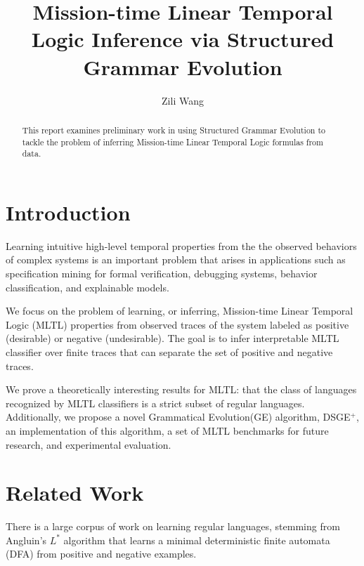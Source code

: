 \documentclass[runningheads]{llncs}
\begin{document}
%
\title{Mission-time Linear Temporal Logic Inference via Structured Grammar Evolution
}
%
%
\author{Zili Wang}
%
%
%
\maketitle              %
%
\begin{abstract}
This report examines preliminary work in using Structured Grammar Evolution to tackle the problem of inferring Mission-time Linear Temporal Logic formulas from data.
\end{abstract}
%
%
%
\section{Introduction}
Learning intuitive high-level temporal properties from the the observed behaviors of complex systems is an important problem that arises in applications such as specification mining for formal verification, debugging systems, behavior classification, and explainable models. 

We focus on the problem of learning, or inferring, Mission-time Linear Temporal Logic (MLTL) properties from observed traces of the system labeled as positive (desirable) or negative (undesirable). The goal is to infer interpretable MLTL classifier over finite traces that can separate the set of positive and negative traces. 

We prove a theoretically interesting results for MLTL: that the class of languages recognized by MLTL classifiers is a strict subset of regular languages. 
Additionally, we propose a novel Grammatical Evolution(GE) algorithm, DSGE$^+$, an implementation of this algorithm, a set of MLTL benchmarks for future research, and experimental evaluation.

\section{Related Work}
There is a large corpus of work on learning regular languages, stemming from Angluin's $L^*$ algorithm \cite{Angluin_1987} that learns a minimal deterministic finite automata (DFA) from positive and negative examples. 
\end{document}
